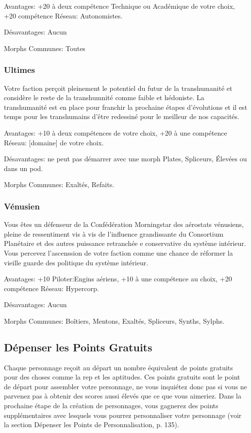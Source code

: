 Avantages: +20 à deux compétence Technique ou Académique de votre choix, +20 compétence Réseau: Autonomistes. 

Désavantages: Aucun 

Morphs Communes: Toutes 

\subsubsection{Ultimes} \label{sec:ultimate} 

Votre faction perçoit pleinement le potentiel du futur de la transhumanité et considère le reste de la transhumnité comme faible et hédoniste. La transhumanité est en place pour franchir la prochaine étapes d'évolutions et il est temps pour les transhumains d'être redessiné pour le meilleur de nos capacités. 

Avantages: +10 à deux compétences de votre choix, +20 à une compétence Réseau: [domaine] de votre choix. 

Désavantages: ne peut pas démarrer avec une morph Plates, Spliceurs, Élevées ou dans un pod. 

Morphs Communes: Exaltés, Refaits. 

\subsubsection{Vénusien} \label{sec:venusian} 

Vous êtes un défenseur de la Confédération Morningstar des aérostats vénusiens, pleine de ressentiment vis à vis de l'influence grandissante du Consortium Planétaire et des autres puissance retranchée e conservative du système intérieur. Vous percevez l'ascenssion de votre faction comme une chance de réformer la vieille guarde des politique du système intérieur. 

Avantages: +10 Piloter:Engins aériens, +10 à une compétence au choix, +20 compétence Réseau: Hypercorp. 

Désavantages: Aucun 

Morphs Communes: Boîtiers, Mentons, Exaltés, Spliceurs, Synths, Sylphs. 

\subsection{Dépenser les Points Gratuits} \label{sec:spend-free-points} 

Chaque personnage reçoit au départ un nombre équivalent de points gratuits pour des choses comme la rep et les aptitudes. Ces points gratuits sont le point de départ pour assembler votre personnage, ne vous inquiétez donc pas si vous ne parvenez pas à obtenir des scores aussi élevés que ce que vous aimeriez. Dans la prochaine étape de la création de personnages, vous gagnerez des points supplémentaires avec lesquels vous pourrez personnaliser votre personnage (voir la section Dépenser les Points de Personnalisation, p. 135). 





